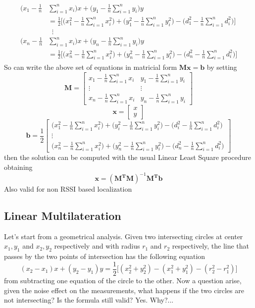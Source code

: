 \documentclass[12pt]{report}
\begin{document}
\begin{align}
\begin{split} 
    \bigg(x_1-\frac{1}{n}&\sum_{i=1}^nx_i\bigg)x+\bigg(y_1-\frac{1}{n}\sum_{i=1}^ny_i\bigg)y\\
    &=\frac{1}{2}\bigg[\bigg(x_1^2-\frac{1}{n}\sum_{i=1}^nx^2_i\bigg)+\bigg(y_1^2-\frac{1}{n}\sum_{i=1}^ny^2_i\bigg)-\bigg(d_1^2-\frac{1}{n}\sum_{i=1}^nd_i^2\bigg)\bigg]\\
&\;\;\vdots\\
    \bigg(x_n-\frac{1}{n}&\sum_{i=1}^nx_i\bigg)x+\bigg(y_n-\frac{1}{n}\sum_{i=1}^ny_i\bigg)y\\
    &=\frac{1}{2}\bigg[\bigg(x_n^2-\frac{1}{n}\sum_{i=1}^nx^2_i\bigg)+\bigg(y_n^2-\frac{1}{n}\sum_{i=1}^ny^2_i\bigg)-\bigg(d_n^2-\frac{1}{n}\sum_{i=1}^nd_i^2\bigg)\bigg]
\end{split}
\end{align}
So can write the above set of equations in matricial form $\mathbf{Mx}=\mathbf{b}$ by setting
$$
\mathbf{M}=\begin{bmatrix}
    x_1-\frac{1}{n}\sum_{i=1}^nx_i&y_1-\frac{1}{n}\sum_{i=1}^ny_i\\
    \vdots&\vdots\\
    x_n-\frac{1}{n}\sum_{i=1}^nx_i&y_n-\frac{1}{n}\sum_{i=1}^ny_i
\end{bmatrix}
$$
$$
\mathbf{x}=\begin{bmatrix}
    x\\
    y
\end{bmatrix}
$$
$$\mathbf{b}=\frac{1}{2}
\begin{bmatrix}
\bigg(x_1^2-\frac{1}{n}\sum_{i=1}^nx^2_i\bigg)+\bigg(y_i^2-\frac{1}{n}\sum_{i=1}^ny^2_i\bigg)-\bigg(d_i^2-\frac{1}{n}\sum_{i=1}^nd_i^2\bigg)\\
\vdots\\
\bigg(x_n^2-\frac{1}{n}\sum_{i=1}^nx^2_i\bigg)+\bigg(y_n^2-\frac{1}{n}\sum_{i=1}^ny^2_i\bigg)-\bigg(d_n^2-\frac{1}{n}\sum_{i=1}^nd_i^2\bigg)
\end{bmatrix}
$$
then the solution can be computed with the usual Linear Least Square procedure obtaining
\begin{equation}
    \mathbf{x}=(\mathbf{M^TM})^{-1}\mathbf{M^Tb}
\end{equation}
Also valid for non RSSI based localization
\clearpage


\subsection{Linear Multilateration}
Let's start from a geometrical analysis. Given two intersecting circles at center $x_{1},y_{1}$ and $x_{2},y_{2}$ respectively and with radius $r_1$ and $r_2$ respectively, the line that passes by the two points of intersection has the following equation
\begin{equation}
    (x_2-x_1)x+(y_2-y_1)y=\frac{1}{2}\big[(x_2^2+y_2^2)-(x_1^2+y_1^2)-(r_2^2-r_1^2)\big]
\end{equation}
from subtracting one equation of the circle to the other. Now a question arise, given the noise effect on the measurements, what happens if the two circles are not intersecting? Is the formula still valid? Yes. Why?... 
\end{document}
